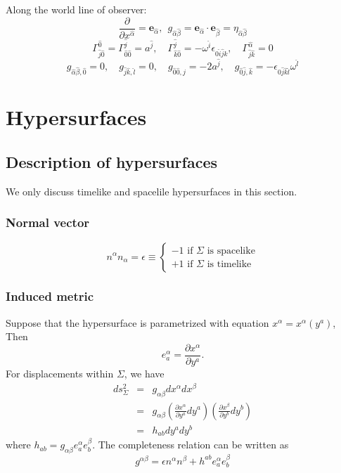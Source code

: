 \noindent
Along the world line of observer:
\[\frac{\partial}{\partial x^{\hat{\alpha}}} = \bm{e}_{\hat{\alpha}}, \ \ g_{\hat{\alpha} \hat{\beta}} = \bm{e}_{\hat{\alpha}} \cdot \bm{e}_{\hat{\beta}} = \eta_{\hat{\alpha}\hat{\beta}}\]
\[\Gamma^{\hat{0}}_{\hat{j} \hat{0}} = \Gamma^{\hat{j}}_{\hat{0} \hat{0}} = a^{\hat{j}}, 
\quad \Gamma^{\hat{j}}_{\hat{k} \hat{0}} = -\omega^{\hat{i}} \epsilon_{0 \hat{i} \hat{j} \hat{k}}, \quad \Gamma^{\hat{\alpha}}_{\hat{j} \hat{k}} = 0 \]
\[g_{\hat{\alpha} \hat{\beta},\hat{0}} = 0, \quad g_{\hat{j} \hat{k},\hat{l}} = 0, \quad
g_{\hat{0} \hat{0},\hat{j}} = -2 a^{\hat{j}}, \quad 
g_{\hat{0} \hat{j},\hat{k}} = -\epsilon_{0 \hat{j} \hat{k} \hat{l}} \omega^{\hat{l}}
\]

\section{Hypersurfaces}
\subsection{Description of hypersurfaces}
\begin{note}
We only discuss timelike and spacelile hypersurfaces in this section.
\end{note}
\subsubsection{Normal vector}
\[n^{\alpha}n_{\alpha} = \epsilon \equiv \begin{cases} -1 \mbox{ if  } \Sigma \mbox{ is spacelike}\\ +1 \mbox{ if  } \Sigma \mbox{ is timelike}\end{cases} \]
\subsubsection{Induced metric}
\noindent
Suppose that the hypersurface is parametrized with equation $x^{\alpha} = x^{\alpha}(y^a)$, Then
\[e_{a}^{\alpha} = \frac{\partial x^{\alpha}}{\partial y^a}.\]
For displacements within $\Sigma$, we have
\begin{eqnarray}
ds_{\Sigma}^{2} &=& g_{\alpha \beta} dx^{\alpha} dx^{\beta} \nonumber \\
&=& g_{\alpha \beta} (\frac{\partial x^{\alpha}}{\partial y^a} dy^a) (\frac{\partial x^{\beta}}{\partial y^b} dy^b) \nonumber \\
&=& h_{ab} dy^a dy^b \nonumber
\end{eqnarray}
where $h_{ab} = g_{\alpha \beta} e_{a}^{\alpha} e_{b}^{\beta}$.
The completeness relation can be written as
\[g^{\alpha \beta} = \epsilon n^{\alpha} n^{\beta} + h^{ab}e_{a}^{\alpha} e_{b}^{\beta} \]

